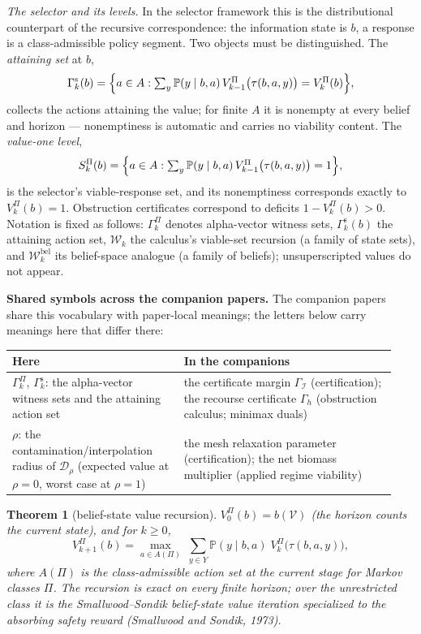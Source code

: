 \documentclass[10pt,twocolumn]{article}
\theoremstyle{plain}
\newtheorem{theorem}{Theorem}
\theoremstyle{definition}
\theoremstyle{remark}
\begin{document}
\emph{The selector and its levels.} In the selector framework this is the
distributional counterpart of the recursive correspondence: the
information state is \(b\), a response is a class-admissible policy
segment. Two objects must be distinguished. The \emph{attaining set} at
\(b\),
\[
\Gamma^{\mathrm{s}}_{k}(b) = \Bigl\{ a \in A : \textstyle\sum_{y}
\mathbb{P}(y \mid b, a)\, V^{\Pi}_{k-1}\bigl(\tau(b, a, y)\bigr)
= V^{\Pi}_{k}(b) \Bigr\},
\]
collects the actions attaining the value; for finite \(A\) it is nonempty
at every belief and horizon --- nonemptiness is automatic and carries no
viability content. The \emph{value-one level},
\[
S^{\Pi}_{k}(b) = \Bigl\{ a \in A : \textstyle\sum_{y} \mathbb{P}(y \mid
b, a)\, V^{\Pi}_{k-1}\bigl(\tau(b, a, y)\bigr) = 1 \Bigr\},
\]
is the selector's viable-response set, and its nonemptiness corresponds
exactly to \(V^{\Pi}_{k}(b) = 1\). Obstruction certificates correspond to
deficits \(1 - V^{\Pi}_{k}(b) > 0\). Notation is fixed as follows:
\(\Gamma^{\Pi}_{k}\) denotes alpha-vector witness sets,
\(\Gamma^{\mathrm{s}}_{k}(b)\) the attaining action set,
\(\mathcal{W}_{k}\) the calculus's viable-set recursion (a family of
state sets), and \(\mathcal{W}^{\mathrm{bel}}_{k}\) its belief-space
analogue (a family of beliefs); unsuperscripted values do not appear.

\medskip
\noindent\textbf{Shared symbols across the companion papers.} The
companion papers share this vocabulary with paper-local meanings; the
letters below carry meanings here that differ there:
\begin{center}\small
\begin{tabular}{@{}p{0.42\linewidth}p{0.52\linewidth}@{}}
\toprule
\textbf{Here} & \textbf{In the companions} \\
\midrule
\(\Gamma^{\Pi}_{k}\), \(\Gamma^{\mathrm{s}}_{k}\): the alpha-vector witness sets and the attaining action set & the certificate margin \(\Gamma_{\mathcal{I}}\) (certification); the recourse certificate \(\Gamma_{h}\) (obstruction calculus; minimax duals) \\
\(\rho\): the contamination/interpolation radius of \(\mathcal{D}_{\rho}\) (expected value at \(\rho = 0\), worst case at \(\rho = 1\)) & the mesh relaxation parameter (certification); the net biomass multiplier (applied regime viability) \\
\bottomrule
\end{tabular}
\end{center}


\begin{theorem}[belief-state value recursion]\label{thm:recursion}
\(V^{\Pi}_{0}(b) = b(\mathcal{V})\) (the horizon counts the current
state), and for \(k \ge 0\),
\[
V^{\Pi}_{k+1}(b) = \max_{a \in A(\Pi)}\; \sum_{y \in Y} \mathbb{P}(y \mid
b, a)\; V^{\Pi}_{k}\bigl(\tau(b, a, y)\bigr),
\]
where \(A(\Pi)\) is the class-admissible action set at the current stage
for Markov classes \(\Pi\). The recursion is exact on every finite
horizon; over the unrestricted class it is the Smallwood--Sondik
belief-state value iteration specialized to the absorbing safety reward
(Smallwood and Sondik, 1973).
\end{theorem}
\end{document}
